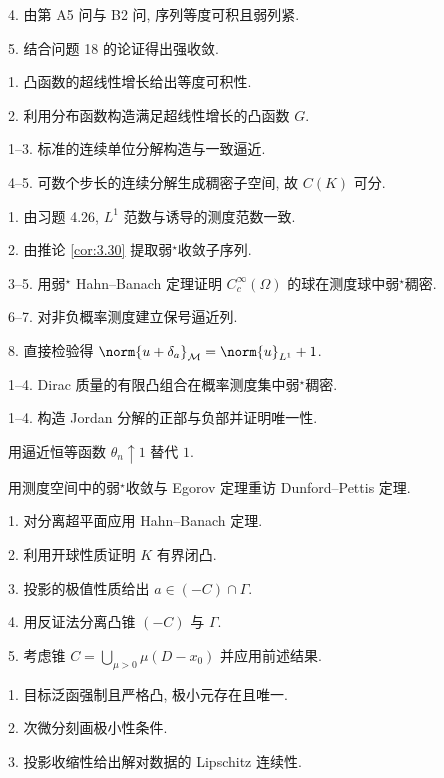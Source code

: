 4. 由第 A5 问与 B2 问, 序列等度可积且弱列紧.

5. 结合问题 18 的论证得出强收敛.


1. 凸函数的超线性增长给出等度可积性.

2. 利用分布函数构造满足超线性增长的凸函数 $G$.



1--3. 标准的连续单位分解构造与一致逼近.

4--5. 可数个步长的连续分解生成稠密子空间, 故 $C(K)$ 可分.


1. 由习题 4.26, $L^1$ 范数与诱导的测度范数一致.

2. 由推论  \ref{cor:3.30} 提取弱$^\star$收敛子序列.

3--5. 用弱$^\star$ Hahn--Banach 定理证明 $C_c^\infty(\Omega)$ 的球在测度球中弱$^\star$稠密.

6--7. 对非负概率测度建立保号逼近列.

8. 直接检验得 $\norm{u+\delta_a}_{\mathcal{M}}=\norm{u}_{L^1}+1$.


1--4. Dirac 质量的有限凸组合在概率测度集中弱$^\star$稠密.


1--4. 构造 Jordan 分解的正部与负部并证明唯一性.


用逼近恒等函数 $\theta_n\uparrow1$ 替代 $1$.


用测度空间中的弱$^\star$收敛与 Egorov 定理重访 Dunford--Pettis 定理.


1. 对分离超平面应用 Hahn--Banach 定理.

2. 利用开球性质证明 $K$ 有界闭凸.

3. 投影的极值性质给出 $a\in(-C)\cap\Gamma$.

4. 用反证法分离凸锥 $(-C)$ 与 $\Gamma$.

5. 考虑锥 $C=\bigcup_{\mu>0}\mu(D-x_0)$ 并应用前述结果.


1. 目标泛函强制且严格凸, 极小元存在且唯一.

2. 次微分刻画极小性条件.

3. 投影收缩性给出解对数据的 Lipschitz 连续性.


